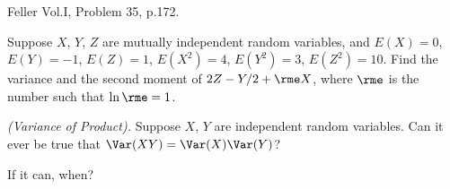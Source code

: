 \begin{problem}[Handout 8, \# 16]
  Feller Vol.\@ I, Problem 35, p.\@ 172.
\end{problem}
\begin{solution}

\end{solution}
\newpage

\begin{problem}[Handout 9, \# 3]
  Suppose \(X\), \(Y\), \(Z\) are mutually independent random variables,
  and \(E(X)=0\), \(E(Y)=-1\), \(E(Z)=1\), \(E(X^2)=4\), \(E(Y^2)=3\),
  \(E(Z^2)=10\). Find the variance and the second moment of
  \(2Z-Y/2+\rme X\), where \(\rme\) is the number such that \(\ln\rme=1\).
\end{problem}
\begin{solution}

\end{solution}
\newpage

\begin{problem}[Handout 9, \# 14]
  \emph{(Variance of Product).} Suppose \(X\), \(Y\) are independent
  random variables. Can it ever be true that \(\Var(XY)=\Var(X)\Var(Y)\)?

  \noindent If it can, when?
\end{problem}
\begin{solution}

\end{solution}

